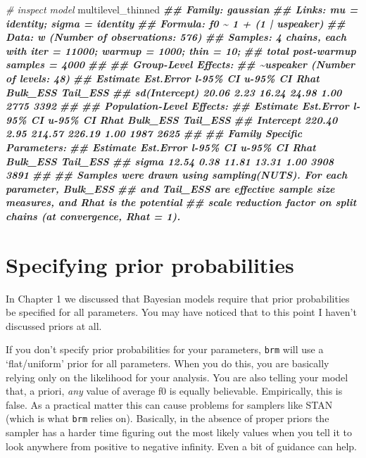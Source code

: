 \documentclass[
]{book}
\newenvironment{Shaded}{\begin{snugshade}}{\end{snugshade}}
\newcommand{\CommentTok}[1]{\textcolor[rgb]{0.56,0.35,0.01}{\textit{#1}}}
\newcommand{\DocumentationTok}[1]{\textcolor[rgb]{0.56,0.35,0.01}{\textbf{\textit{#1}}}}
\newcommand{\NormalTok}[1]{#1}
\begin{document}
\begin{Shaded}
\begin{Highlighting}[]
\CommentTok{\# inspect model}
\NormalTok{multilevel\_thinned}
\DocumentationTok{\#\#  Family: gaussian }
\DocumentationTok{\#\#   Links: mu = identity; sigma = identity }
\DocumentationTok{\#\# Formula: f0 \textasciitilde{} 1 + (1 | uspeaker) }
\DocumentationTok{\#\#    Data: w (Number of observations: 576) }
\DocumentationTok{\#\# Samples: 4 chains, each with iter = 11000; warmup = 1000; thin = 10;}
\DocumentationTok{\#\#          total post{-}warmup samples = 4000}
\DocumentationTok{\#\# }
\DocumentationTok{\#\# Group{-}Level Effects: }
\DocumentationTok{\#\# \textasciitilde{}uspeaker (Number of levels: 48) }
\DocumentationTok{\#\#               Estimate Est.Error l{-}95\% CI u{-}95\% CI Rhat Bulk\_ESS Tail\_ESS}
\DocumentationTok{\#\# sd(Intercept)    20.06      2.23    16.24    24.98 1.00     2775     3392}
\DocumentationTok{\#\# }
\DocumentationTok{\#\# Population{-}Level Effects: }
\DocumentationTok{\#\#           Estimate Est.Error l{-}95\% CI u{-}95\% CI Rhat Bulk\_ESS Tail\_ESS}
\DocumentationTok{\#\# Intercept   220.40      2.95   214.57   226.19 1.00     1987     2625}
\DocumentationTok{\#\# }
\DocumentationTok{\#\# Family Specific Parameters: }
\DocumentationTok{\#\#       Estimate Est.Error l{-}95\% CI u{-}95\% CI Rhat Bulk\_ESS Tail\_ESS}
\DocumentationTok{\#\# sigma    12.54      0.38    11.81    13.31 1.00     3908     3891}
\DocumentationTok{\#\# }
\DocumentationTok{\#\# Samples were drawn using sampling(NUTS). For each parameter, Bulk\_ESS}
\DocumentationTok{\#\# and Tail\_ESS are effective sample size measures, and Rhat is the potential}
\DocumentationTok{\#\# scale reduction factor on split chains (at convergence, Rhat = 1).}
\end{Highlighting}
\end{Shaded}

\hypertarget{specifying-prior-probabilities}{%
\section{Specifying prior probabilities}\label{specifying-prior-probabilities}}

In Chapter 1 we discussed that Bayesian models require that prior probabilities be specified for all parameters. You may have noticed that to this point I haven't discussed priors at all.

If you don't specify prior probabilities for your parameters, \texttt{brm} will use a `flat/uniform' prior for all parameters. When you do this, you are basically relying only on the likelihood for your analysis. You are also telling your model that, a priori, \emph{any} value of average f0 is equally believable. Empirically, this is false. As a practical matter this can cause problems for samplers like STAN (which is what \texttt{brm} relies on). Basically, in the absence of proper priors the sampler has a harder time figuring out the most likely values when you tell it to look anywhere from positive to negative infinity. Even a bit of guidance can help.
\end{document}

